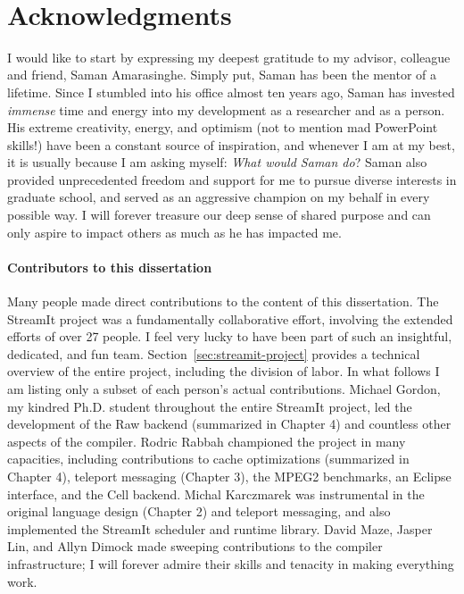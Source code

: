 \newpage
~ \vspace{-3.7\baselineskip}\\
\enlargethispage{0.3\baselineskip}
\section*{Acknowledgments}

I would like to start by expressing my deepest gratitude to my
advisor, colleague and friend, Saman Amarasinghe.  Simply put, Saman
has been the mentor of a lifetime.  Since I stumbled into his office
almost ten years ago, Saman has invested {\it immense} time and energy
into my development as a researcher and as a person.  His extreme
creativity, energy, and optimism (not to mention mad PowerPoint
skills!) have been a constant source of inspiration, and whenever I am
at my best, it is usually because I am asking myself: {\it What would
  Saman do}?  Saman also provided unprecedented freedom and support
for me to pursue diverse interests in graduate school, and served as
an aggressive champion on my behalf in every possible way.  I will
forever treasure our deep sense of shared purpose and can only aspire
to impact others as much as he has impacted me.


\vspace{-8pt}\paragraph*{Contributors to this dissertation} Many
people made direct contributions to the content of this
dissertation.  The StreamIt project was a fundamentally
collaborative effort, involving the extended efforts of over 27
people.  I feel very lucky to have been part of such an insightful,
dedicated, and fun team.  Section~\ref{sec:streamit-project}
provides a technical overview of the entire project, including the
division of labor.  In what follows I am listing only a subset of
each person's actual contributions.  Michael Gordon, my kindred
Ph.D. student throughout the entire StreamIt project, led the
development of the Raw backend (summarized in Chapter 4) and
countless other aspects of the compiler.  Rodric Rabbah championed
the project in many capacities, including contributions to cache
optimizations (summarized in Chapter 4), teleport messaging (Chapter
3), the MPEG2 benchmarks, an Eclipse interface, and the Cell
backend.  Michal Karczmarek was instrumental in the original
language design (Chapter 2) and teleport messaging, and also
implemented the StreamIt scheduler and runtime library.  David Maze,
Jasper Lin, and Allyn Dimock made sweeping contributions to the
compiler infrastructure; I will forever admire their skills and
tenacity in making everything work.

